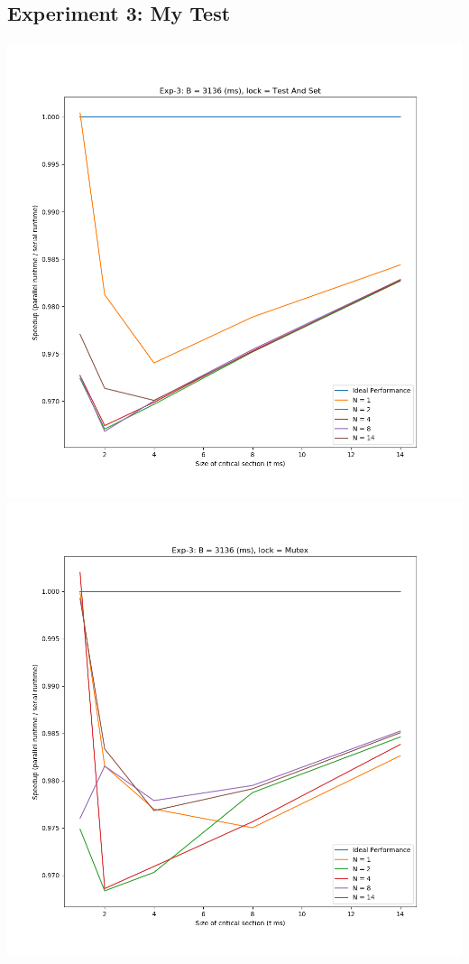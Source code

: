 \documentclass[]{article}
\begin{document}
\subsection{Experiment 3: My Test}
\includegraphics[scale=0.5]{graphs/exp3_t.png}\\
\includegraphics[scale=0.5]{graphs/exp3_p.png}\\
\end{document}
